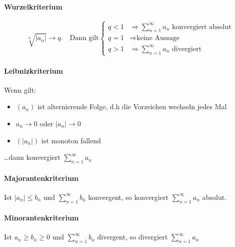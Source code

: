 \paragraph{Wurzelkriterium}
\[
\sqrt[n]{\left | a_n \right |} \to q. \quad \text{Dann gilt} \begin{cases}
q < 1 & \Rightarrow \sum_{n=1}^\infty a_n \text{ konvergiert absolut}\\
q = 1 & \Rightarrow \text{keine Aussage}\\
q > 1 & \Rightarrow \sum_{n=1}^\infty a_n \text{ divergiert}
\end{cases}
\]

\paragraph{Leibnizkriterium}
Wenn gilt:
\begin{itemize}
  \item $(a_n)$ ist alternierende Folge, d.h die Vorzeichen wechseln jedes Mal
  \item $a_n \to 0$ oder $|a_n| \to 0$
  \item $(|a_n|)$ ist monoton fallend
\end{itemize}
\ldots dann konvergiert $\sum_{n=1}^\infty a_n$

\paragraph{Majorantenkriterium}
Ist $|a_n| \leq b_n$ und $\sum_{n=1}^\infty b_n$ konvergent, so konvergiert
$\sum_{n=1}^\infty a_n$ absolut.

\paragraph{Minorantenkriterium}
Ist $a_n \geq b_n \geq 0$ und $\sum_{n=1}^\infty b_n$ divergent, so divergiert
$\sum_{n=1}^\infty a_n$
